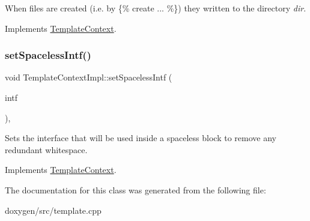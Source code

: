 When files are created (i.\+e. by \{\% create ... \%\}) they written to the directory {\itshape dir}. 

Implements \mbox{\hyperlink{class_template_context_ab3aaaa03df934615ccfa3209420cd93d}{Template\+Context}}.

\mbox{\label{class_template_context_impl_a70bde90b2b3c08769cd0c7587ffaf33a}} 
\subsubsection{\texorpdfstring{setSpacelessIntf()}{setSpacelessIntf()}}
{\footnotesize\ttfamily void Template\+Context\+Impl\+::set\+Spaceless\+Intf (\begin{DoxyParamCaption}\item[{\mbox{\hyperlink{class_template_spaceless_intf}{Template\+Spaceless\+Intf}} $\ast$}]{intf }\end{DoxyParamCaption})\hspace{0.3cm}{\ttfamily [inline]}, {\ttfamily [virtual]}}

Sets the interface that will be used inside a spaceless block to remove any redundant whitespace. 

Implements \mbox{\hyperlink{class_template_context_a11e64f588d21aeda2b57a4bc4e06ecc7}{Template\+Context}}.



The documentation for this class was generated from the following file\+:\begin{DoxyCompactItemize}
\item 
doxygen/src/template.\+cpp\end{DoxyCompactItemize}
